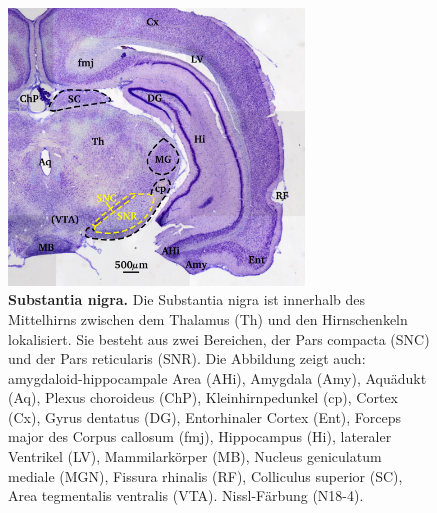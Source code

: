 \documentclass[12pt,a4paper,pdftex]{article}
\begin{document}
\begin{figure}[H]
    \centering
    \includegraphics[width=0.7\textwidth]{pictures/Basalganglia/SN.png}
    \caption[Substantia nigra]{\textbf{Substantia nigra.} Die Substantia nigra ist innerhalb des Mittelhirns zwischen dem Thalamus (Th) und den Hirnschenkeln lokalisiert. Sie besteht aus zwei Bereichen, der Pars compacta (SNC) und der Pars reticularis (SNR). Die Abbildung zeigt auch:
    amygdaloid-hippocampale Area (AHi), Amygdala (Amy), Aquädukt (Aq), Plexus choroideus (ChP), Kleinhirnpedunkel (cp), Cortex (Cx), Gyrus dentatus (DG), Entorhinaler Cortex (Ent), Forceps major des Corpus callosum (fmj), Hippocampus (Hi), lateraler Ventrikel (LV), Mammilarkörper (MB), Nucleus geniculatum mediale (MGN), Fissura rhinalis (RF), Colliculus superior (SC), Area tegmentalis ventralis (VTA). Nissl-Färbung (N18-4).}
    \label{fig:SN_Basalganglia}
\end{figure}
\end{document}
